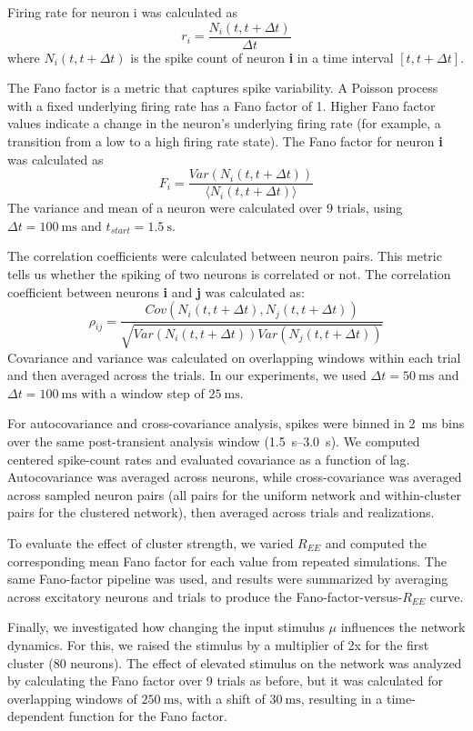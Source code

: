 Firing rate for neuron i was calculated as
\begin{equation}
\label{eq:rate_definition}
r_i = \frac{N_i(t,t+\Delta t)}{\Delta t}
\end{equation}
  where $N_i(t,t+\Delta t)$ is the spike count of neuron \textbf{i} in a time interval $[t, t+\Delta t]$.

The Fano factor is a metric that captures spike variability. A Poisson process with a fixed underlying firing rate has a Fano factor of 1. Higher Fano factor values indicate a change in the neuron's underlying firing rate (for example, a transition from a low to a high firing rate state). The Fano factor for neuron \textbf{i} was calculated as 
\[
F_i = \frac{Var(N_i(t,t+\Delta t))}{\langle N_i(t,t+\Delta t)\rangle}
\]
The variance and mean of a neuron were calculated over 9 trials, using $\Delta t = \SI{100}{\ms}$ and $t_{start} = \SI{1.5}{\s}$.

The correlation coefficients were calculated between neuron pairs. This metric tells us whether the spiking of two neurons is correlated or not. The correlation coefficient between neurons \textbf{i} and \textbf{j} was calculated as: 
\[
\rho_{ij} = \frac{Cov(N_i(t,t+\Delta t), N_j(t,t+\Delta t))}{\sqrt{Var(N_i(t,t+\Delta t))Var(N_j(t,t+\Delta t))}}
\]
Covariance and variance was calculated on overlapping windows within each trial and then averaged across the trials. In our experiments, we used $\Delta t = \SI{50}{\ms}$ and $\Delta t = \SI{100}{\ms}$ with a window step of $\SI{25}{\ms}$.

For autocovariance and cross-covariance analysis, spikes were binned in \SI{2}{\ms} bins over the same post-transient analysis window (\SIrange{1.5}{3.0}{\s}). We computed centered spike-count rates and evaluated covariance as a function of lag. Autocovariance was averaged across neurons, while cross-covariance was averaged across sampled neuron pairs (all pairs for the uniform network and within-cluster pairs for the clustered network), then averaged across trials and realizations.

To evaluate the effect of cluster strength, we varied $R_{EE}$ and computed the corresponding mean Fano factor for each value from repeated simulations. The same Fano-factor pipeline was used, and results were summarized by averaging across excitatory neurons and trials to produce the Fano-factor-versus-$R_{EE}$ curve.

Finally, we investigated how changing the input stimulus $\mu$ influences the network dynamics. For this, we raised the stimulus by a multiplier of 2x for the first cluster (80 neurons). The effect of elevated stimulus on the network was analyzed by calculating the Fano factor over 9 trials as before, but it was calculated for overlapping windows of $\SI{250}{\ms}$, with a shift of $\SI{30}{\ms}$, resulting in a time-dependent function for the Fano factor.
